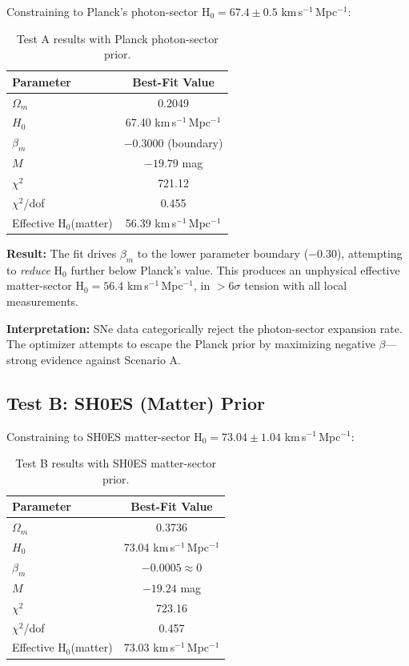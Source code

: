 \documentclass[twocolumn,superscriptaddress,prd,amsmath,amssymb]{revtex4-2}
\begin{document}
Constraining to Planck's photon-sector H$_0 = 67.4 \pm 0.5$ km\,s$^{-1}$\,Mpc$^{-1}$:

\begin{table}[h]
\centering
\begin{tabular}{lc}
\hline\hline
Parameter & Best-Fit Value \\
\hline
$\Omega_m$ & 0.2049 \\
$H_0$ & 67.40 km\,s$^{-1}$\,Mpc$^{-1}$ \\
$\beta_m$ & $-0.3000$ (boundary) \\
$M$ & $-19.79$ mag \\
\hline
$\chi^2$ & 721.12 \\
$\chi^2$/dof & 0.455 \\
\hline
Effective H$_0$(matter) & 56.39 km\,s$^{-1}$\,Mpc$^{-1}$ \\
\hline\hline
\end{tabular}
\caption{Test A results with Planck photon-sector prior.}
\label{tab:test_a}
\end{table}

\textbf{Result:} The fit drives $\beta_m$ to the lower parameter boundary ($-0.30$), attempting to \textit{reduce} H$_0$ further below Planck's value. This produces an unphysical effective matter-sector H$_0 = 56.4$ km\,s$^{-1}$\,Mpc$^{-1}$, in $>6\sigma$ tension with all local measurements.

\textbf{Interpretation:} SNe data categorically reject the photon-sector expansion rate. The optimizer attempts to escape the Planck prior by maximizing negative $\beta$—strong evidence against Scenario A.

\subsection{Test B: SH0ES (Matter) Prior}

Constraining to SH0ES matter-sector H$_0 = 73.04 \pm 1.04$ km\,s$^{-1}$\,Mpc$^{-1}$:

\begin{table}[h]
\centering
\begin{tabular}{lc}
\hline\hline
Parameter & Best-Fit Value \\
\hline
$\Omega_m$ & 0.3736 \\
$H_0$ & 73.04 km\,s$^{-1}$\,Mpc$^{-1}$ \\
$\beta_m$ & $-0.0005 \approx 0$ \\
$M$ & $-19.24$ mag \\
\hline
$\chi^2$ & 723.16 \\
$\chi^2$/dof & 0.457 \\
\hline
Effective H$_0$(matter) & 73.03 km\,s$^{-1}$\,Mpc$^{-1}$ \\
\hline\hline
\end{tabular}
\caption{Test B results with SH0ES matter-sector prior.}
\label{tab:test_b}
\end{table}
\end{document}
